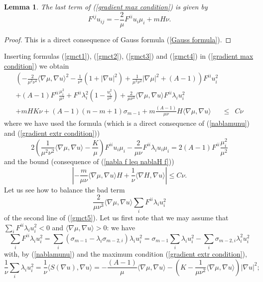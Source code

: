 \documentclass[10pt,reqno,oneside]{amsart}
\newtheorem{lem}{Lemma}[section]
\theoremstyle{definition}
\theoremstyle{remark}
\begin{document}
\begin{lem}
The last term of (\ref{gradient max condition}) is given by
\begin{equation}\label{gmct4}
F^{ij}u_{ij}=-\frac{2}{\mu}F^{ii}u_i\mu_i+mH\nu.
\end{equation}
\end{lem}
\begin{proof}
This is a direct consequence of Gauss formula (\ref{Gauss formula}).
\end{proof}
Inserting formulas (\ref{gmct1}), (\ref{gmct2}), (\ref{gmct3}) and (\ref{gmct4}) in (\ref{gradient max condition}) we obtain
\begin{eqnarray}
\left(-\frac{2}{\mu^2\nu^4}\langle\nabla\mu,\nabla u\rangle^2-\frac{1}{\nu^2}(1+|\nabla u|^2)+\frac{1}{\mu^2\nu^2}|\nabla \mu|^2+ (A-1)\right)F^{ii}u_i^2&&\label{gmct5}\\
+(A-1)F^{ii}\frac{\mu_i^2}{\mu^2}+F^{ii}\lambda_i^2\left(1-\frac{u_i^2}{\nu^2}\right)+\frac{2}{\mu\nu^3}\langle\nabla\mu,\nabla u\rangle F^{ii}\lambda_iu_i^2&&\nonumber\\
+mHK\nu+(A-1)(n-m+1)\sigma_{m-1}+m\frac{(A-1)}{\mu\nu}H\langle\nabla\mu,\nabla u\rangle&\leq&C\nu\nonumber
\end{eqnarray}
where we have used the formula (which is a direct consequence of (\ref{nablamunu}) and (\ref{gradient extr condition}))
$$2\left(\frac{1}{\mu^2\nu^2}\langle\nabla\mu,\nabla u\rangle-\frac{K}{\mu}\right)F^{ii}u_i\mu_i-\frac{2}{\mu\nu}F^{ii}\lambda_iu_i\mu_i=2(A-1)F^{ii}\frac{\mu_i^2}{\mu^2}$$
and the bound (consequence of (\ref{nabla f leq nablaH f}))
$$\left|-\frac{m}{\mu\nu}\langle\nabla\mu,\nabla u\rangle H+\frac{1}{\nu}\langle \nabla H,\nabla u\rangle\right|\leq C\nu.$$
Let us see how to balance the bad term
\begin{equation}\label{gradient bad term}
\frac{2}{\mu\nu^3}\langle\nabla\mu,\nabla u\rangle \sum_iF^{ii}\lambda_iu_i^2
\end{equation}
of the second line of (\ref{gmct5}). Let us first note that we may assume that $\sum_iF^{ii}\lambda_iu_i^2<0$ and $\langle\nabla\mu,\nabla u\rangle>0$: we have
\begin{equation}\label{gmct5-6}
\sum_iF^{ii}\lambda_iu_i^2=\sum_i(\sigma_{m-1}-\lambda_i\sigma_{m-2,i})\lambda_iu_i^2=\sigma_{m-1}\sum_i\lambda_iu_i^2-\sum_i\sigma_{m-2,i}\lambda_i^2u_i^2
\end{equation}
with, by (\ref{nablamunu}) and the maximum condition (\ref{gradient extr condition}), 
\begin{equation*}
\frac{1}{\nu}\sum_i\lambda_iu_i^2=\frac{1}{\nu}\langle S(\nabla u),\nabla u\rangle=-\frac{(A-1)}{\mu}\langle\nabla\mu,\nabla u\rangle-\left(K-\frac{1}{\mu\nu^2}\langle\nabla\mu,\nabla u\rangle\right)|\nabla u|^2;
\end{equation*}
\end{document}
